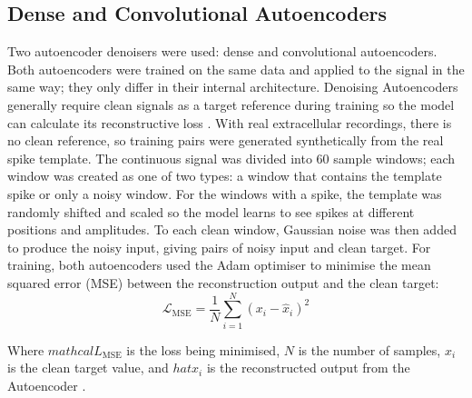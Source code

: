 \documentclass[ %
                    author={Daniel Page},
                supervisor={Dr. Andrew Calway},
                    degree={MSc},
                     title={Some Structural Guidelines for Data Science MSc Theses, Including Those With Long Titles that Run Across Multiple Lines on the Front Page},
                  subtitle={And those including an optional subtitle too, for good measure},
                      type={},
                      year={2021}]{dissertation}
\begin{document}
\subsection{Dense and Convolutional Autoencoders}
Two autoencoder denoisers were used: dense and convolutional autoencoders. Both autoencoders were trained on the same data and applied to the signal in the same way; they only differ in their internal architecture. 
Denoising Autoencoders generally require clean signals as a target reference during training so the model can calculate its reconstructive loss \cite{vincent_extracting_2008}. With real extracellular recordings, there is no clean reference, so training pairs were generated synthetically from the real spike template. The continuous signal was divided into 60 sample windows; each window was created as one of two types: a window that contains the template spike or only a noisy window. For the windows with a spike, the template was randomly shifted and scaled so the model learns to see spikes at different positions and amplitudes. To each clean window, Gaussian noise was then added to produce the noisy input, giving pairs of noisy input and clean target. For training, both autoencoders used the Adam optimiser to minimise the mean squared error (MSE) between the reconstruction output and the clean target:
\begin{equation}
    \mathcal{L}_{\text{MSE}} = \frac{1}{N} \sum_{i=1}^{N} \left( x_i - \hat{x}_i \right)^2
    \label{MSE}
\end{equation}

Where $mathcal{L}_{\text{MSE}}$ is the loss being minimised, $N$ is the number of samples, $x_i$ is the clean target value, and $hat{x}_i$ is the reconstructed output from the Autoencoder \cite{jadon_comprehensive_2022}. 
\end{document}
